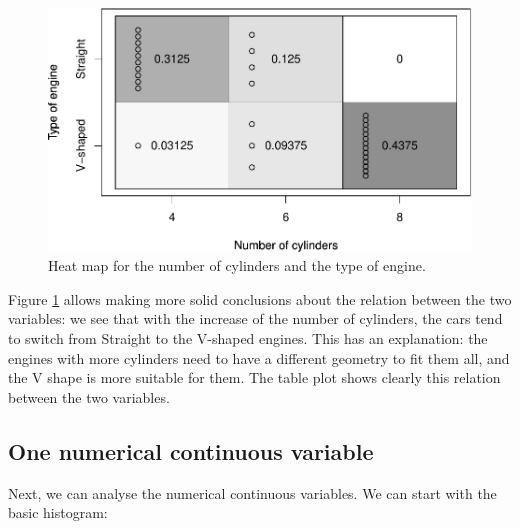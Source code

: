 \documentclass[
]{book}
\newenvironment{Shaded}{\begin{snugshade}}{\end{snugshade}}
\newcommand{\DataTypeTok}[1]{\textcolor[rgb]{0.13,0.29,0.53}{#1}}
\newcommand{\KeywordTok}[1]{\textcolor[rgb]{0.13,0.29,0.53}{\textbf{#1}}}
\newcommand{\NormalTok}[1]{#1}
\newcommand{\OperatorTok}[1]{\textcolor[rgb]{0.81,0.36,0.00}{\textbf{#1}}}
\newcommand{\OtherTok}[1]{\textcolor[rgb]{0.56,0.35,0.01}{#1}}
\newcommand{\StringTok}[1]{\textcolor[rgb]{0.31,0.60,0.02}{#1}}
\theoremstyle{definition}
\theoremstyle{definition}
\theoremstyle{definition}
\theoremstyle{definition}
\theoremstyle{remark}
\begin{document}
\begin{figure}
\centering
\includegraphics{Svetunkov---Statistics-for-Business-Analytics_files/figure-latex/tableplotCYLVS-1.pdf}
\caption{\label{fig:tableplotCYLVS}Heat map for the number of cylinders and the type of engine.}
\end{figure}

Figure \ref{fig:tableplotCYLVS} allows making more solid conclusions about the relation between the two variables: we see that with the increase of the number of cylinders, the cars tend to switch from Straight to the V-shaped engines. This has an explanation: the engines with more cylinders need to have a different geometry to fit them all, and the V shape is more suitable for them. The table plot shows clearly this relation between the two variables.

\hypertarget{one-numerical-continuous-variable}{%
\subsection{One numerical continuous variable}\label{one-numerical-continuous-variable}}

Next, we can analyse the numerical continuous variables. We can start with the basic histogram:

\begin{Shaded}
\end{Shaded}
\end{document}

